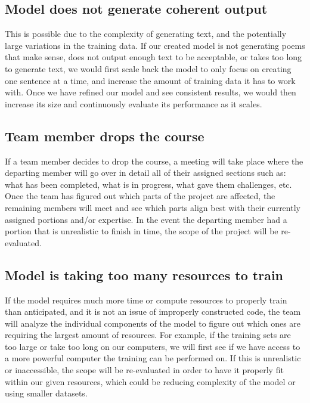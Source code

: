 \documentclass{article} %
\begin{document}
\subsection{Model does not generate coherent output}

This is possible due to the complexity of generating text, and the potentially large variations in the training data. If our created model is not generating poems that make sense, does not output enough text to be acceptable, or takes too long to generate text, we would first scale back the model to only focus on creating one sentence at a time, and increase the amount of training data it has to work with. Once we have refined our model and see consistent results, we would then increase its size and continuously evaluate its performance as it scales.

\subsection{Team member drops the course}

If a team member decides to drop the course, a meeting will take place where the departing member will go over in detail all of their assigned sections such as: what has been completed, what is in progress, what gave them challenges, etc. Once the team has figured out which parts of the project are affected, the remaining members will meet and see which parts align best with their currently assigned portions and/or expertise. In the event the departing member had a portion that is unrealistic to finish in time, the scope of the project will be re-evaluated.

\subsection{Model is taking too many resources to train}

If the model requires much more time or compute resources to properly train than anticipated, and it is not an issue of improperly constructed code, the team will analyze the individual components of the model to figure out which ones are requiring the largest amount of resources. For example, if the training sets are too large or take too long on our computers, we will first see if we have access to a more powerful computer the training can be performed on. If this is unrealistic or inaccessible, the scope will be re-evaluated in order to have it properly fit within our given resources, which could be reducing complexity of the model or using smaller datasets.
\end{document}
